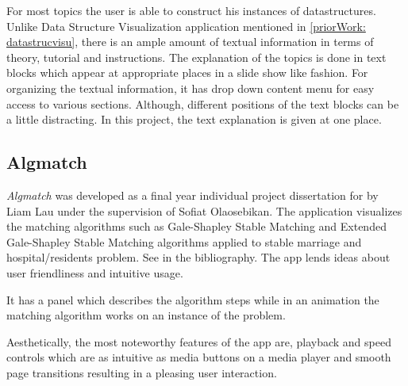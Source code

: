 For most topics the user is able to construct his instances of datastructures.
Unlike Data Structure Visualization application mentioned in
\autoref{priorWork: datastrucvisu}, there is an ample amount of textual
information in terms of theory, tutorial and instructions. The explanation of
the topics is done in text blocks which appear at appropriate places in a slide
show like fashion. For organizing the textual information, it has drop down
content menu for easy access to various sections. Although, different positions
of the text blocks can be a little distracting. In this project, the text explanation
is given at one place.


\subsection{Algmatch}
\label{priorWork: algmatch}
\emph{Algmatch} was developed as a final year individual project dissertation for
by Liam Lau under the supervision of Sofiat Olaosebikan. The application
visualizes the matching algorithms such as Gale-Shapley Stable Matching and
Extended Gale-Shapley Stable Matching algorithms applied to stable marriage and
hospital/residents problem. See \cite{LiamApp} in the bibliography. The app
lends ideas about user friendliness and intuitive usage.

It has a panel which describes the algorithm steps while in an animation the
matching algorithm works on an instance of the problem.

Aesthetically, the most noteworthy features of the app are, playback and speed
controls which are as intuitive as media buttons on a media player and smooth
page transitions resulting in a pleasing user interaction.
